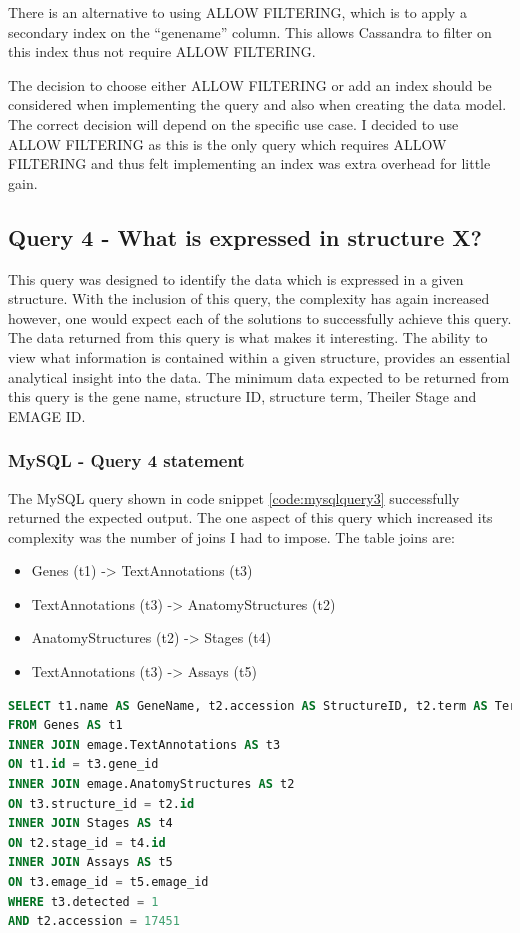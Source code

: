 There is an alternative to using ALLOW FILTERING, which is to apply a secondary index on the ``genename'' column. This allows Cassandra to filter on this index thus not require ALLOW FILTERING.

The decision to choose either ALLOW FILTERING or add an index should be considered when implementing the query and also when creating the data model. The correct decision will depend on the specific use case. I decided to use ALLOW FILTERING as this is the only query which requires ALLOW FILTERING and thus felt implementing an index was extra overhead for little gain.

\subsection*{Query 4 - What is expressed in structure X?}\label{query4}
This query was designed to identify the data which is expressed in a given structure. With the inclusion of this query, the complexity has again increased however, one would expect each of the solutions to successfully achieve this query. The data returned from this query is what makes it interesting. The ability to view what information is contained within a given structure, provides an essential analytical insight into the data. The minimum data expected to be returned from this query is the gene name, structure ID, structure term, Theiler Stage and EMAGE ID.

\subsubsection*{MySQL - Query 4 statement}\label{mysqlquery4statement}
The MySQL query shown in code snippet \ref{code:mysqlquery3} successfully returned the expected output. The one aspect of this query which increased its complexity was the number of joins I had to impose. The table joins are:

\begin{itemize}
\item Genes (t1) -> TextAnnotations (t3)
\item TextAnnotations (t3) -> AnatomyStructures (t2)
\item AnatomyStructures (t2) -> Stages (t4)
\item TextAnnotations (t3) -> Assays (t5)
\end{itemize}

\begin{lstlisting}[language=SQL, caption=MySQL query 4 statement. What is expressed in structure X?., label=code:mysqlquery4]
SELECT t1.name AS GeneName, t2.accession AS StructureID, t2.term AS TermName, t4.theilerstage AS TheilerStage, t3.emage_id AS EMAGE_ID
FROM Genes AS t1
INNER JOIN emage.TextAnnotations AS t3
ON t1.id = t3.gene_id
INNER JOIN emage.AnatomyStructures AS t2
ON t3.structure_id = t2.id
INNER JOIN Stages AS t4
ON t2.stage_id = t4.id
INNER JOIN Assays AS t5
ON t3.emage_id = t5.emage_id
WHERE t3.detected = 1
AND t2.accession = 17451
\end{lstlisting}

